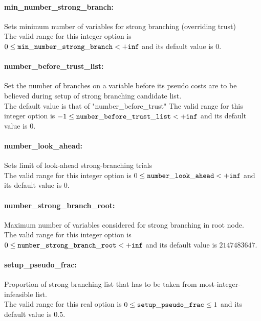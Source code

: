 \paragraph{min\_number\_strong\_branch:}\label{opt:min_number_strong_branch} Sets minimum number of variables for strong branching (overriding trust) \\
 The valid range for this integer option is
$0 \le {\tt min\_number\_strong\_branch } <  {\tt +inf}$
and its default value is $0$.


\paragraph{number\_before\_trust\_list:}\label{opt:number_before_trust_list} Set the number of branches on a variable before its pseudo costs are to be believed during setup of strong branching candidate list. \\
 The default value is that of "number\_before\_trust" The valid range for this integer option is
$-1 \le {\tt number\_before\_trust\_list } <  {\tt +inf}$
and its default value is $0$.


\paragraph{number\_look\_ahead:}\label{opt:number_look_ahead} Sets limit of look-ahead strong-branching trials \\
 The valid range for this integer option is
$0 \le {\tt number\_look\_ahead } <  {\tt +inf}$
and its default value is $0$.


\paragraph{number\_strong\_branch\_root:}\label{opt:number_strong_branch_root} Maximum number of variables considered for strong branching in root node. \\
 The valid range for this integer option is
$0 \le {\tt number\_strong\_branch\_root } <  {\tt +inf}$
and its default value is $2147483647$.


\paragraph{setup\_pseudo\_frac:}\label{opt:setup_pseudo_frac} Proportion of strong branching list that has to be taken from most-integer-infeasible list. \\
 The valid range for this real option is 
$0 \le {\tt setup\_pseudo\_frac } \le 1$
and its default value is $0.5$.


